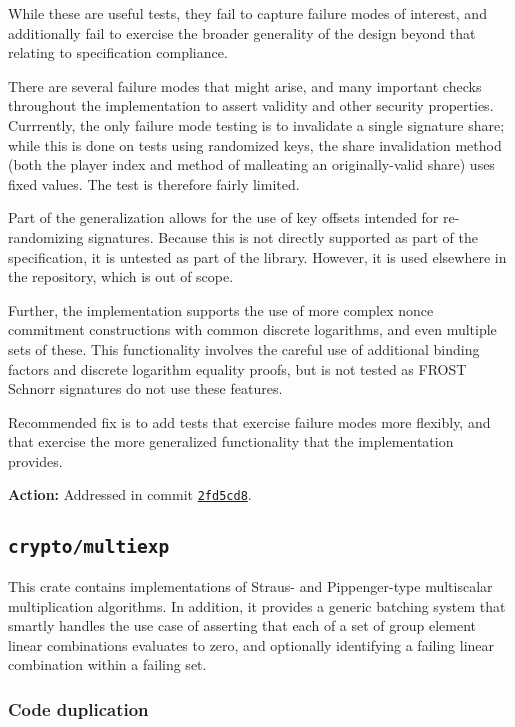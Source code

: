 \documentclass{article}
\begin{document}
While these are useful tests, they fail to capture failure modes of interest, and additionally fail to exercise the broader generality of the design beyond that relating to specification compliance.

There are several failure modes that might arise, and many important checks throughout the implementation to assert validity and other security properties.
Currrently, the only failure mode testing is to invalidate a single signature share; while this is done on tests using randomized keys, the share invalidation method (both the player index and method of malleating an originally-valid share) uses fixed values.
The test is therefore fairly limited.

Part of the generalization allows for the use of key offsets intended for re-randomizing signatures.
Because this is not directly supported as part of the specification, it is untested as part of the library.
However, it is used elsewhere in the repository, which is out of scope.

Further, the implementation supports the use of more complex nonce commitment constructions with common discrete logarithms, and even multiple sets of these.
This functionality involves the careful use of additional binding factors and discrete logarithm equality proofs, but is not tested as FROST Schnorr signatures do not use these features.


Recommended fix is to add tests that exercise failure modes more flexibly, and that exercise the more generalized functionality that the implementation provides.

\textbf{Action:} Addressed in commit \href{https://github.com/serai-dex/serai/commit/2fd5cd8161426182b4d9ea481d65d9d6ff995dbf}{\texttt{2fd5cd8}}.



\subsection{\texttt{crypto/multiexp}}

This crate contains implementations of Straus- and Pippenger-type multiscalar multiplication algorithms.
In addition, it provides a generic batching system that smartly handles the use case of asserting that each of a set of group element linear combinations evaluates to zero, and optionally identifying a failing linear combination within a failing set.


\subsubsection{Code duplication}
\end{document}
